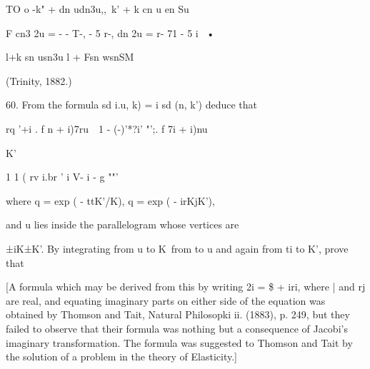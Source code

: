TO o -k" + dn udn3u,,\ k' + k cn u en Su

F cn3 2u = - - T-, - 5 r-, dn 2u = r- 71 - 5 i~ •

l+k sn usn3u l + Fsn wsnSM

(Trinity, 1882.)

60. From the formula sd i.u, k) = i sd (n, k') deduce that

rq '+i . f n + i)7ru\ \ 1 - (-)'*?i' "';. f 7i + i)nu

K'

1 1 ( rv i.br ' i V- i - g ""'

where q = exp ( - ttK'/K), q = exp ( - irKjK'),

and u lies inside the parallelogram whose vertices are

±iK±K'. By integrating from u to K\ from to u and again from ti to K',
prove that

[A formula which may be derived from this by writing 2i = \$ + iri,
where | and rj are real, and equating imaginary parts on either side
of the equation was obtained by Thomson and Tait, Natural Philosopki
ii. (1883), p. 249, but they failed to observe that their formula was
nothing but a consequence of Jacobi's imaginary transformation. The
formula was suggested to Thomson and Tait by the solution of a problem
in the theory of Elasticity.]

